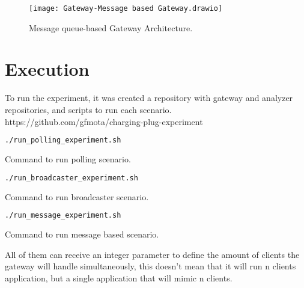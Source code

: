 \begin{figure}
    \centering
    \texttt{[image: Gateway-Message based Gateway.drawio]}
    \caption{Message queue-based Gateway Architecture.\label{fig:subfigures5}}
\end{figure}

\section{Execution}
\label{sec:execution}

To run the experiment, it was created a repository with gateway and analyzer repositories, and scripts to run each scenario. https://github.com/gfmota/charging-plug-experiment

\begin{program}
    \centering
  
  \begin{lstlisting}[language=bash, style=wider]
    ./run_polling_experiment.sh
  \end{lstlisting}
  
    \caption{Command to run polling scenario.\label{prog:java1}}
\end{program}

\begin{program}
    \centering
  
  \begin{lstlisting}[language=bash, style=wider]
    ./run_broadcaster_experiment.sh
  \end{lstlisting}
  
    \caption{Command to run broadcaster scenario.\label{prog:java2}}
\end{program}

\begin{program}
    \centering
  
  \begin{lstlisting}[language=bash, style=wider]
    ./run_message_experiment.sh
  \end{lstlisting}
  
    \caption{Command to run message based scenario.\label{prog:java3}}
\end{program}

All of them can receive an integer parameter to define the amount of clients the gateway will handle simultaneously, this doesn't mean that it will run n clients application, but a single application that will mimic n clients.

